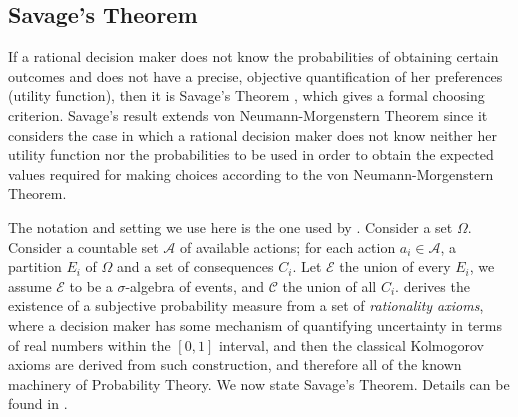 \documentclass[review]{elsarticle}
\begin{document}
\subsection{Savage's Theorem}
\label{savage_theorem}
If a rational decision maker does not know the probabilities of obtaining certain outcomes and does not have a precise, objective quantification of her preferences (utility function), then it is Savage's Theorem \citep{savage1954the}, which gives a formal choosing criterion. Savage's result extends von Neumann-Morgenstern Theorem since it considers the case in which a rational decision maker does not know neither her utility function nor the probabilities to be used in order to obtain the expected values required for making choices according to the von Neumann-Morgenstern Theorem. 

The notation and setting we use here is the one used by \cite{bernardo2000bayesian}. Consider a set $\Omega$. Consider a countable set $\mathcal{A}$ of available actions; for each action $a_i \in \mathcal{A}$, a partition $E_i$ of $\Omega$ and a set of consequences $C_i$. Let $\mathcal{E}$ the union of every $E_i$, we assume $\mathcal{E}$ to be a $\sigma$-algebra of events, and $\mathcal{C}$ the union of all $C_i$. \cite{bernardo2000bayesian} derives the existence of a subjective probability measure from a set of \textit{rationality axioms}, where a decision maker has some mechanism of quantifying uncertainty in terms of real numbers within the $[0,1]$ interval, and then the classical Kolmogorov axioms are derived from such construction, and therefore all of the known machinery of Probability Theory. We now state Savage's Theorem. Details can be found in \citep{savage1954the,kreps1988choice,bernardo2000bayesian,gilboa2009decision}.
\end{document}
